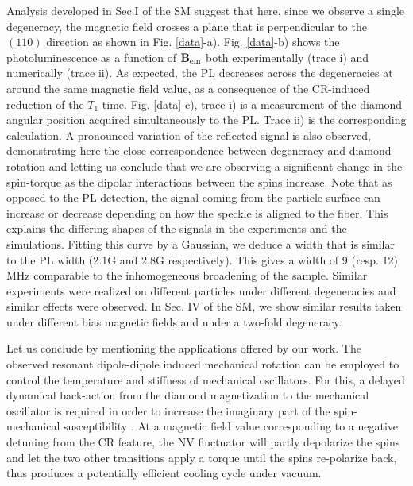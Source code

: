 \documentclass[preprintnumbers,amsmath,amssymb,superscriptaddress,twocolumn,showpacs]{revtex4-1}
\begin{document}
Analysis developed in Sec.I of the SM \cite{SM_CR_meca} suggest that here, since we observe a single degeneracy, the magnetic field crosses a plane that is perpendicular to the $(110)$ direction as shown in Fig. \ref{data}-a).
Fig. \ref{data}-b) shows the photoluminescence as a function of $\bf B_{\rm em}$ both experimentally (trace i) and numerically (trace ii).
As expected, the PL decreases across the degeneracies at around the same magnetic field value, as a consequence of the CR-induced reduction of the $T_1$ time.
Fig. \ref{data}-c), trace i) is a measurement of the diamond angular position acquired simultaneously to the PL. Trace ii) is the corresponding calculation.   
A pronounced variation of the reflected signal is also observed, demonstrating here the close correspondence between degeneracy and diamond rotation and letting us conclude that we are observing a significant change in the spin-torque as the dipolar interactions between the spins increase. Note that as opposed to the PL detection, the signal coming from the particle surface can increase or decrease depending on how the speckle is aligned to the fiber. This explains the differing shapes of the signals in the experiments and the simulations. 
Fitting this curve by a Gaussian, we deduce a width that is similar to the PL width (2.1G and 2.8G respectively). This gives a width of 9 (resp. 12) MHz  comparable to the inhomogeneous broadening of the sample.
Similar experiments were realized on different particles under different degeneracies and similar effects were observed.
In Sec. IV of the SM, we show similar results taken under different bias magnetic fields and under a two-fold degeneracy. 

Let us conclude by mentioning the applications offered by our work. 
The observed resonant dipole-dipole induced mechanical rotation can be employed to control the temperature and stiffness of mechanical oscillators. 
For this, a delayed dynamical back-action from the diamond magnetization to the mechanical oscillator is required \cite{Aspelmeyer} in order to increase the imaginary part of the spin-mechanical susceptibility \cite{DelordNat}.
At a magnetic field value corresponding to a negative detuning from the CR feature, the NV fluctuator will partly depolarize the spins and let the two other transitions apply a torque until the spins re-polarize back, thus produces a potentially efficient cooling cycle under vacuum.  %
\end{document}
